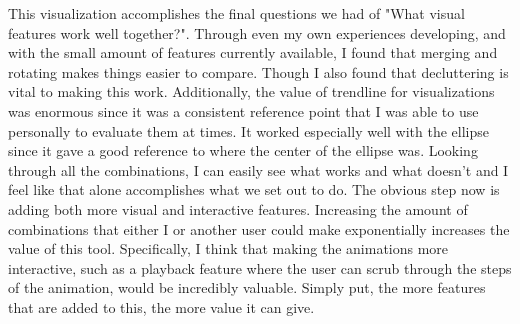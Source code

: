 \documentclass{proc}
\begin{document}
		This visualization accomplishes the final questions we had of "What visual features work well together?". Through even my own experiences developing, and with the small amount of features currently available, I found that merging and rotating makes things easier to compare. Though I also found that decluttering is vital to making this work. Additionally, the value of trendline for visualizations was enormous since it was a consistent reference point that I was able to use personally to evaluate them at times. It worked especially well with the ellipse since it gave a good reference to where the center of the ellipse was. Looking through all the combinations, I can easily see what works and what doesn't and I feel like that alone accomplishes what we set out to do. The obvious step now is adding both more visual and interactive features. Increasing the amount of combinations that either I or another user could make exponentially increases the value of this tool. Specifically, I think that making the animations more interactive, such as a playback feature where the user can scrub through the steps of the animation, would be incredibly valuable. Simply put, the more features that are added to this, the more value it can give. 

	

	
	
\end{document}
